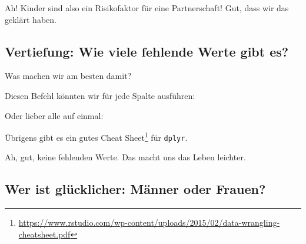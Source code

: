 \documentclass[12pt,ngerman,]{book}
\makeatletter
\newenvironment{Shaded}{\begin{snugshade}}{\end{snugshade}}
\newcommand{\KeywordTok}[1]{\textcolor[rgb]{0.13,0.29,0.53}{\textbf{#1}}}
\newcommand{\DataTypeTok}[1]{\textcolor[rgb]{0.13,0.29,0.53}{#1}}
\newcommand{\StringTok}[1]{\textcolor[rgb]{0.31,0.60,0.02}{#1}}
\newcommand{\CommentTok}[1]{\textcolor[rgb]{0.56,0.35,0.01}{\textit{#1}}}
\newcommand{\OperatorTok}[1]{\textcolor[rgb]{0.81,0.36,0.00}{\textbf{#1}}}
\newcommand{\NormalTok}[1]{#1}
\let\rmarkdownfootnote\footnote%
\def\footnote{\protect\rmarkdownfootnote}
\renewcommand{\href}[2]{#2\footnote{\url{#1}}}
\newenvironment{kframe}{%
\medskip{}
\setlength{\fboxsep}{.8em}
 \def\at@end@of@kframe{}%
 \ifinner\ifhmode%
  \def\at@end@of@kframe{\end{minipage}}%
  \begin{minipage}{\columnwidth}%
 \fi\fi%
 \def\FrameCommand##1{\hskip\@totalleftmargin \hskip-\fboxsep
 \colorbox{shadecolor}{##1}\hskip-\fboxsep
     \hskip-\linewidth \hskip-\@totalleftmargin \hskip\columnwidth}%
 \MakeFramed {\advance\hsize-\width
   \@totalleftmargin\z@ \linewidth\hsize
   \@setminipage}}%
 {\par\unskip\endMakeFramed%
 \at@end@of@kframe}
\renewenvironment{Shaded}{\begin{kframe}}{\end{kframe}}
\theoremstyle{definition}
\theoremstyle{definition}
\theoremstyle{remark}
\makeatother
\begin{document}
Ah! Kinder sind also ein Risikofaktor für eine Partnerschaft! Gut, dass
wir das geklärt haben.

\subsection{Vertiefung: Wie viele fehlende Werte gibt
es?}\label{vertiefung-wie-viele-fehlende-werte-gibt-es}

Was machen wir am besten damit?

Diesen Befehl könnten wir für jede Spalte ausführen:

\begin{Shaded}
\end{Shaded}

Oder lieber alle auf einmal:

\begin{Shaded}
\end{Shaded}

Übrigens gibt es ein gutes
\href{https://www.rstudio.com/wp-content/uploads/2015/02/data-wrangling-cheatsheet.pdf}{Cheat
Sheet} für \texttt{dplyr}.

Ah, gut, keine fehlenden Werte. Das macht uns das Leben leichter.

\subsection{Wer ist glücklicher: Männer oder
Frauen?}\label{wer-ist-glucklicher-manner-oder-frauen}

\begin{Shaded}
\end{Shaded}
\end{document}
